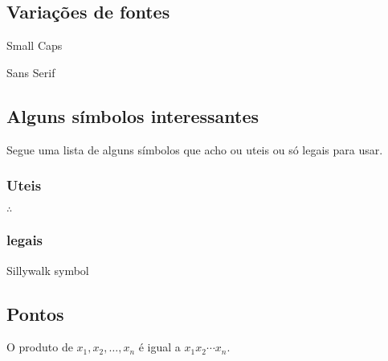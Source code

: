 \documentclass[]{article}
\begin{document}
\subsection{Variações de fontes}
{\sc Small Caps} 

{\sf Sans Serif}

\subsection{Alguns símbolos interessantes}
Segue uma lista de alguns símbolos que acho ou uteis ou só legais para usar.
\subsubsection{Uteis}
$\therefore$

\subsubsection{legais}
Sillywalk symbol \Denarius


\subsection{Pontos}
O produto de $ x_1, x_2, \dots, x_n$ é igual a $x_1 x_2 \cdots x_n$.
\end{document}
